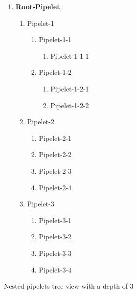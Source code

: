 \documentclass[12pt]{report}
\begin{document}
\begin{figure}[H]
\centering
\begin{enumerate}
	\item \textbf{Root-Pipelet}
		\begin{enumerate}
			\item Pipelet-1
				\begin{enumerate}
					\item Pipelet-1-1
						\begin{enumerate}
							\item Pipelet-1-1-1
						\end{enumerate}
					\item Pipelet-1-2
						\begin{enumerate}
							\item Pipelet-1-2-1
							\item Pipelet-1-2-2
						\end{enumerate}
				\end{enumerate}
			\item Pipelet-2
				\begin{enumerate}
					\item Pipelet-2-1
					\item Pipelet-2-2
					\item Pipelet-2-3
					\item Pipelet-2-4
				\end{enumerate}
			\item Pipelet-3
				\begin{enumerate}
					\item Pipelet-3-1
					\item Pipelet-3-2
					\item Pipelet-3-3
					\item Pipelet-3-4
				\end{enumerate}
		\end{enumerate}
\end{enumerate}
\caption{Nested pipelets tree view with a depth of 3}
\label{fig:nestedPipeletsTree}
\end{figure}
\end{document}
